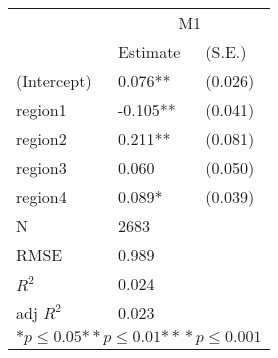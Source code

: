 \begin{tabular}{*{3}{l}}
\hline
                  & \multicolumn{2}{c}{M1}   \tabularnewline
                   &Estimate  &(S.E.)  \tabularnewline
 \hline
 \hline
   (Intercept)     &0.076**   &   (0.026) \tabularnewline
   region1         &-0.105**   &   (0.041) \tabularnewline
   region2         &0.211**   &   (0.081) \tabularnewline
   region3         &0.060   &   (0.050) \tabularnewline
   region4         &0.089*   &   (0.039) \tabularnewline
 \hline
 N                 &2683       &        \tabularnewline
 RMSE             &0.989         & \tabularnewline
 $R^2$             &0.024         & \tabularnewline
 adj $R^2$         &0.023         & \tabularnewline
 \hline
\hline
 
 \multicolumn{3}{c}{${*  p}\le 0.05$${*\!\!*  p}\le 0.01$${*\!\!*\!\!*  p}\le 0.001$}\tabularnewline
 \end{tabular}